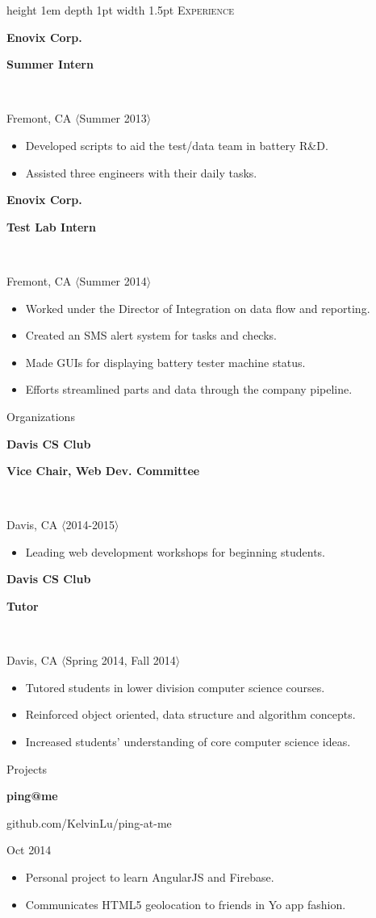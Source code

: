 \documentclass[letterpaper]{article}
\newcommand{\sectiontitle}[1]{
	{\color{magenta} \vline height 1em depth 1pt width 1.5pt}%
	{\large \colorbox{offwhite}{\color{black} \textsc{#1}}}
	\vspace*{0.5em}
}
\newcommand{\sectionseparator}[1]{
	\hline
	\vspace*{1em}
}
\newcommand{\experiencepanel}[4]{
	\textbf{{#1}}
	\begin{footnotesize}
		\textbf{{#2}}
	\end{footnotesize}
	\\
	\begin{scriptsize}
		{#3} $\langle${#4}$\rangle$
	\end{scriptsize}
}
\newcommand{\projectpanel}[3]{
	\textbf{{#1}}
	\begin{footnotesize}
		{#2}
	\end{footnotesize}
	\begin{scriptsize}
		{#3}
	\end{scriptsize}
}
\newenvironment{statementlist}{
		\begin{small}
		\begin{itemize}
		\setlength\itemsep{0em}
}{
		\end{itemize}
		\end{small}
		\vspace*{1em}
}
\begin{document}
	\begin{minipage}[t]{0.55\textwidth}

		\sectiontitle{Experience}

		\experiencepanel{Enovix Corp.}{Summer Intern}{Fremont, CA}{Summer 2013}
		\begin{statementlist}
			\item Developed scripts to aid the test/data team in battery R\&D.
			\item Assisted three engineers with their daily tasks.
		\end{statementlist}

		\experiencepanel{Enovix Corp.}{Test Lab Intern}{Fremont, CA}{Summer 2014}
		\begin{statementlist}
			\item Worked under the Director of Integration on data flow and reporting.
			\item Created an SMS alert system for tasks and checks.
			\item Made GUIs for displaying battery tester machine status.
			\item Efforts streamlined parts and data through the company pipeline.
		\end{statementlist}

		\sectionseparator

		\sectiontitle{Organizations}

		\experiencepanel{Davis CS Club}{Vice Chair, Web Dev. Committee}{Davis, CA}{2014-2015}
		\begin{statementlist}
			\item Leading web development workshops for beginning students.
		\end{statementlist}

		\experiencepanel{Davis CS Club}{Tutor}{Davis, CA}{Spring 2014, Fall 2014}
		\begin{statementlist}
			\item Tutored students in lower division computer science courses.
			\item Reinforced object oriented, data structure and algorithm concepts.
			\item Increased students' understanding of core computer science ideas.
		\end{statementlist}

		\sectionseparator

		\sectiontitle{Projects}

		\projectpanel{ping@me}{github.com/KelvinLu/ping-at-me}{Oct 2014}
		\begin{statementlist}
			\item Personal project to learn AngularJS and Firebase.
			\item Communicates HTML5 geolocation to friends in Yo app fashion.
		\end{statementlist}


\end{minipage}
\end{document}
